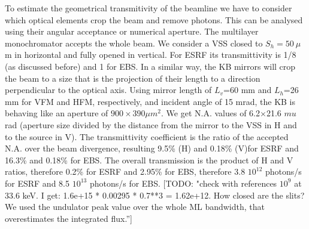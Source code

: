 \documentclass{iucr}              %
\newcommand{\todo}[1]{{\color{red}[TODO: "#1'']}}
\begin{document}
To estimate the geometrical transmitivity of the beamline we have to consider which optical elements crop the beam and remove photons. This can be analysed using their angular acceptance or numerical aperture. The multilayer monochromator accepts the whole beam. We consider a VSS closed to $S_h=50~\mu$m in horizontal and fully opened in vertical. For ESRF its transmittivity is 1/8 (as discussed before) and 1 for EBS. In a similar way, the KB mirrors will crop the beam to a size that is the projection of their length to a direction perpendicular to the optical axis. Using mirror length of $L_v$=60 mm and $L_h$=26 mm for VFM and HFM, respectively, and incident angle of 15 mrad, the KB is behaving like an aperture of $900 \times 390 \mu m^2$. We get N.A. values of 6.2$\times$21.6 $mu$rad (aperture size divided by the distance from the mirror to the VSS in H and to the source in V). The transmittivity coefficient is the ratio of the accepted N.A. over the beam divergence, resulting 9.5\% (H) and 0.18\% (V)for ESRF and 16.3\% and 0.18\% for EBS. The overall transmission is the product of H and V ratios, therefore 0.2\% for ESRF and 2.95\% for EBS, therefore 3.8 $10^{12}$ photons/s for ESRF and 8.5 $10^{13}$ photons/s for EBS. 
\todo{check with references $10^9$ at 33.6 keV. I get: 1.6e+15 * 0.00295 * 0.7**3 = 1.62e+12. How closed are the slits? We used the undulator peak value over the whole ML bandwidth, that overestimates the integrated flux.}
\end{document}
